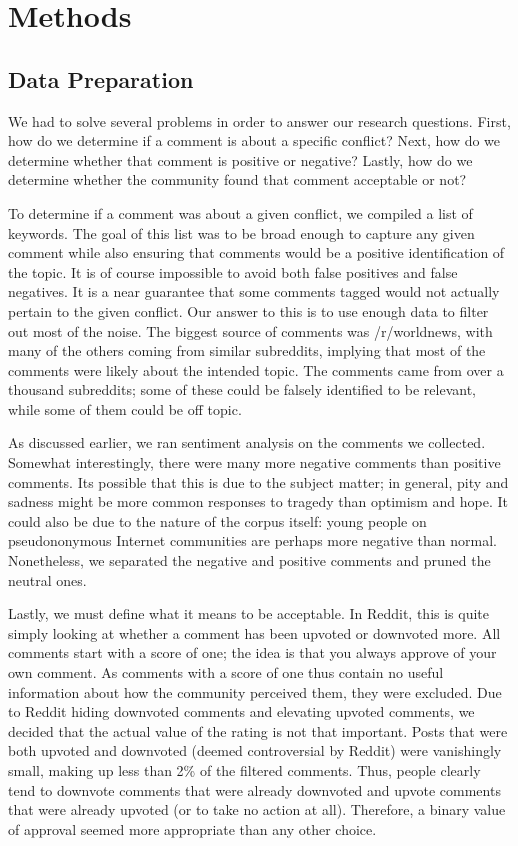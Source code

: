 \section{Methods}
\subsection{Data Preparation}
We had to solve several problems in order to answer our research questions. First, how do we determine if a comment is about a specific conflict? Next, how do we determine whether that comment is positive or negative? Lastly, how do we determine whether the community found that comment acceptable or not?

To determine if a comment was about a given conflict, we compiled a list of keywords. The goal of this list was to be broad enough to capture any given comment while also ensuring that comments would be a positive identification of the topic. It is of course impossible to avoid both false positives and false negatives. It is a near guarantee that some comments tagged would not actually pertain to the given conflict. Our answer to this is to use enough data to filter out most of the noise. The biggest source of comments was /r/worldnews, with many of the others coming from similar subreddits, implying that most of the comments were likely about the intended topic. The comments came from over a thousand subreddits; some of these could be falsely identified to be relevant, while some of them could be off topic. 

As discussed earlier, we ran sentiment analysis on the comments we collected. Somewhat interestingly, there were many more negative comments than positive comments. Its possible that this is due to the subject matter; in general, pity and sadness might be more common responses to tragedy than optimism and hope. It could also be due to the nature of the corpus itself: young people on pseudononymous Internet communities are perhaps more negative than normal. Nonetheless, we separated the negative and positive comments and pruned the neutral ones.

Lastly, we must define what it means to be acceptable. In Reddit, this is quite simply looking at whether a comment has been upvoted or downvoted more. All comments start with a score of one; the idea is that you always approve of your own comment. As comments with a score of one thus contain no useful information about how the community perceived them, they were excluded. Due to Reddit hiding downvoted comments and elevating upvoted comments, we decided that the actual value of the rating is not that important. Posts that were both upvoted and downvoted (deemed controversial by Reddit) were vanishingly small, making up less than 2\% of the filtered comments. Thus, people clearly tend to downvote comments that were already downvoted and upvote comments that were already upvoted (or to take no action at all). Therefore, a binary value of approval seemed more appropriate than any other choice.

